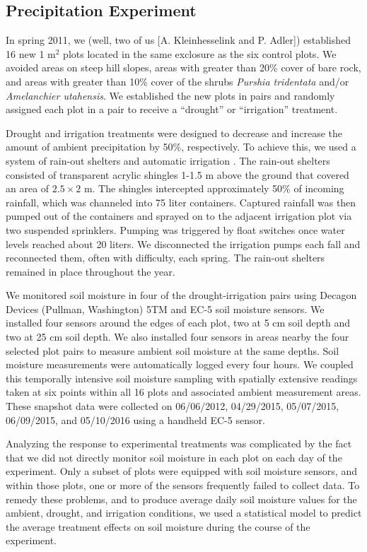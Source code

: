 \documentclass[fleqn,10pt,lineno]{wlpeerj} %
\begin{document}
\subsection{Precipitation Experiment}\label{precipitation-experiment}

In spring 2011, we (well, two of us {[}A. Kleinhesselink and P.
Adler{]}) established 16 new 1 m\(^2\) plots located in the same
exclosure as the six control plots. We avoided areas on steep hill
slopes, areas with greater than 20\% cover of bare rock, and areas with
greater than 10\% cover of the shrubs \emph{Purshia tridentata} and/or
\emph{Amelanchier utahensis}. We established the new plots in pairs and
randomly assigned each plot in a pair to receive a ``drought'' or
``irrigation'' treatment.

Drought and irrigation treatments were designed to decrease and increase
the amount of ambient precipitation by 50\%, respectively. To achieve
this, we used a system of rain-out shelters and automatic irrigation
\citep{Gherardi2013}. The rain-out shelters consisted of transparent
acrylic shingles 1-1.5 m above the ground that covered an area of
\(2.5\times2\) m. The shingles intercepted approximately 50\% of
incoming rainfall, which was channeled into 75 liter containers.
Captured rainfall was then pumped out of the containers and sprayed on
to the adjacent irrigation plot via two suspended sprinklers. Pumping
was triggered by float switches once water levels reached about 20
liters. We disconnected the irrigation pumps each fall and reconnected
them, often with difficulty, each spring. The rain-out shelters remained
in place throughout the year.

We monitored soil moisture in four of the drought-irrigation pairs using
Decagon Devices (Pullman, Washington) 5TM and EC-5 soil moisture
sensors. We installed four sensors around the edges of each plot, two at
5 cm soil depth and two at 25 cm soil depth. We also installed four
sensors in areas nearby the four selected plot pairs to measure ambient
soil moisture at the same depths. Soil moisture measurements were
automatically logged every four hours. We coupled this temporally
intensive soil moisture sampling with spatially extensive readings taken
at six points within all 16 plots and associated ambient measurement
areas. These snapshot data were collected on 06/06/2012, 04/29/2015,
05/07/2015, 06/09/2015, and 05/10/2016 using a handheld EC-5 sensor.

Analyzing the response to experimental treatments was complicated by the
fact that we did not directly monitor soil moisture in each plot on each
day of the experiment. Only a subset of plots were equipped with soil
moisture sensors, and within those plots, one or more of the sensors
frequently failed to collect data. To remedy these problems, and to
produce average daily soil moisture values for the ambient, drought, and
irrigation conditions, we used a statistical model to predict the
average treatment effects on soil moisture during the course of the
experiment.
\end{document}
